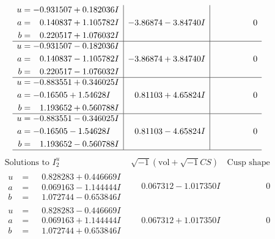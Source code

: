 \documentclass[1p]{elsarticle_modified}
\theoremstyle{definition}
\newcommand{\I}{\sqrt{-1}}
\begin{document}
$$\begin{array}{c|c|c}
\begin{aligned}
u &= -0.931507 + 0.182036 I \\
a &= \phantom{-}0.140837 + 1.105782 I \\
b &= \phantom{-}0.220517 + 1.076032 I\end{aligned}
 & -3.86874 - 3.84740 I & \phantom{-0.000000 } 0 \\ \hline\begin{aligned}
u &= -0.931507 - 0.182036 I \\
a &= \phantom{-}0.140837 - 1.105782 I \\
b &= \phantom{-}0.220517 - 1.076032 I\end{aligned}
 & -3.86874 + 3.84740 I & \phantom{-0.000000 } 0 \\ \hline\begin{aligned}
u &= -0.883551 + 0.346025 I \\
a &= -0.16505 + 1.54628 I \\
b &= \phantom{-}1.193652 + 0.560788 I\end{aligned}
 & \phantom{-}0.81103 + 4.65824 I & \phantom{-0.000000 } 0 \\ \hline\begin{aligned}
u &= -0.883551 - 0.346025 I \\
a &= -0.16505 - 1.54628 I \\
b &= \phantom{-}1.193652 - 0.560788 I\end{aligned}
 & \phantom{-}0.81103 - 4.65824 I & \phantom{-0.000000 } 0\\
 \hline 
 \end{array}$$\newpage$$\begin{array}{c|c|c}  
\text{Solutions to }I^u_{2}& \I (\text{vol} + \sqrt{-1}CS) & \text{Cusp shape}\\
 \hline 
\begin{aligned}
u &= \phantom{-}0.828283 + 0.446669 I \\
a &= \phantom{-}0.069163 - 1.144444 I \\
b &= \phantom{-}1.072744 - 0.653846 I\end{aligned}
 & \phantom{-}0.067312 - 1.017350 I & \phantom{-0.000000 } 0 \\ \hline\begin{aligned}
u &= \phantom{-}0.828283 - 0.446669 I \\
a &= \phantom{-}0.069163 + 1.144444 I \\
b &= \phantom{-}1.072744 + 0.653846 I\end{aligned}
 & \phantom{-}0.067312 + 1.017350 I & \phantom{-0.000000 } 0 \\ \hline\begin{aligned}

\end{aligned}
\end{array}$$
\end{document}
